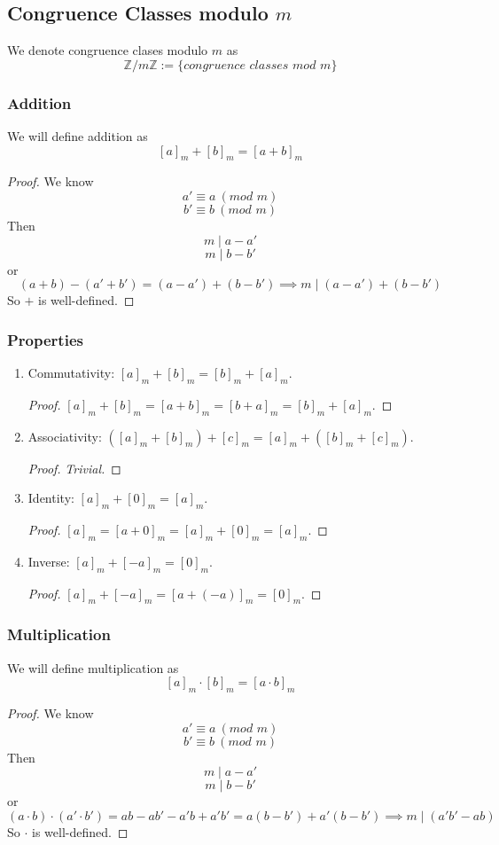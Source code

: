 \documentclass{report}
\newcommand{\Z}{\mathbb{Z}}
\newcommand{\modclass}[1]{\Z/{#1}\Z}
\renewcommand{\mod}[1]{\ (\textit{mod } {#1})}
\begin{document}
\subsection{Congruence Classes modulo $m$}
We denote congruence clases modulo $m$ as
\[\modclass{m} := \{ \textit{congruence classes mod } m \}\]


\subsubsection{Addition}
We will define addition as
\[[a]_m + [b]_m = [a + b]_m\]
\begin{proof}
    We know
    \[a' \equiv a \mod{m}\]
    \[b' \equiv b \mod{m}\]
    Then
    \[m \mid a - a'\]
    \[m \mid b - b'\]
    or
    \[(a + b) - (a' + b') = (a - a') + (b - b') \implies m \mid (a - a') + (b - b')\]
    So $+$ is well-defined.
\end{proof}


\subsubsection{Properties}
\begin{enumerate}[label=\textit{(\roman*)}]
    \item Commutativity: $[a]_m + [b]_m = [b]_m + [a]_m$.
        \begin{proof}
            $[a]_m + [b]_m = [a + b]_m = [b + a]_m = [b]_m + [a]_m$.
        \end{proof}
    \item Associativity: $([a]_m + [b]_m) + [c]_m = [a]_m + ([b]_m + [c]_m)$.
        \begin{proof}
            \textit{Trivial.}
        \end{proof}
    \item Identity: $[a]_m + [0]_m = [a]_m$.
        \begin{proof}
            $[a]_m = [a + 0]_m = [a]_m + [0]_m = [a]_m$.
        \end{proof}
    \item Inverse: $[a]_m + [-a]_m = [0]_m$.
        \begin{proof}
            $[a]_m + [-a]_m = [a + (-a)]_m = [0]_m$.
        \end{proof}
\end{enumerate}


\subsubsection{Multiplication}
We will define multiplication as
\[[a]_m \cdot [b]_m = [a \cdot b]_m\]
\begin{proof}
    We know
    \[a' \equiv a \mod{m}\]
    \[b' \equiv b \mod{m}\]
    Then
    \[m \mid a - a'\]
    \[m \mid b - b'\]
    or
    \[(a \cdot b) \cdot (a' \cdot b') = ab - ab' - a'b + a'b' = a(b - b') + a'(b - b') \implies m \mid (a'b' - ab)\]
    So $\cdot$ is well-defined.
\end{proof}
\end{document}
